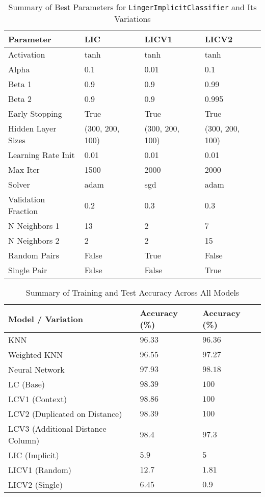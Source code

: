 \documentclass[a4paper, 12pt]{report}
\begin{document}
\begin{table}[H]
    \centering
    \caption{Summary of Best Parameters for \texttt{LingerImplicitClassifier} and Its Variations}
    \label{tab:best_parameters_LIC_variations_exp5}
    \footnotesize
    \begin{tabular}{|l|l|l|l|}
    \hline
    \textbf{Parameter} & \textbf{LIC} & \textbf{LICV1} & \textbf{LICV2} \\
    \hline
    Activation & tanh & tanh & tanh \\
    Alpha & 0.1 & 0.01 & 0.1 \\
    Beta 1 & 0.9 & 0.9 & 0.99 \\
    Beta 2 & 0.9 & 0.9 & 0.995 \\
    Early Stopping & True & True & True \\
    Hidden Layer Sizes & (300, 200, 100) & (300, 200, 100) & (300, 200, 100) \\
    Learning Rate Init & 0.01 & 0.01 & 0.01 \\
    Max Iter & 1500 & 2000 & 2000 \\
    Solver & adam & sgd & adam \\
    Validation Fraction & 0.2 & 0.3 & 0.3 \\
    N Neighbors 1 & 13 & 2 & 7 \\
    N Neighbors 2 & 2 & 2 & 15 \\
    Random Pairs & False & True & False \\
    Single Pair & False & False & True \\
    \hline
    \end{tabular}
\end{table}
\clearpage

\begin{table}[H]
    \centering
    \caption{Summary of Training and Test Accuracy Across All Models}
    \label{tab:summary_accuracy_all_models_exp5}
    \begin{tabular}{|l|l|l|}
    \toprule
    \textbf{Model / Variation} & \textbf{Accuracy (\%)} & \textbf{Accuracy (\%)} \\
    \midrule
    KNN & $96.33$ & $96.36$ \\
    Weighted KNN & $96.55$ & $97.27$ \\
    Neural Network & $97.93$ & $98.18$ \\
    LC (Base) & $98.39$ & $100$ \\
    LCV1 (Context) & $98.86$ & $100$ \\
    LCV2 (Duplicated on Distance) & $98.39$ & $100$ \\
    LCV3 (Additional Distance Column) & $98.4$ & $97.3$ \\
    LIC (Implicit) & $5.9$ & $5$ \\
    LICV1 (Random) & $12.7$ & $1.81$ \\
    LICV2 (Single) & $6.45$ & $0.9$ \\
    \bottomrule
    \end{tabular}
\end{table}
\end{document}
